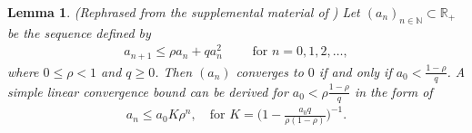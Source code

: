\documentclass{article}
\def\R{{\mathbb R}}
\newcommand{\hlnew}[1]{{#1}}
\newtheorem{lemma}{Lemma}
\begin{document}
\begin{lemma} 
\label{lem:scalar}
(Rephrased from the supplemental material of \cite{vu2018adaptive}) Let \hlnew{$(a_n)_{n \in \mathbb{N}} \subset \R_+$} be the sequence defined by 
\begin{align*}
a_{n+1} \leq \rho a_{n} + q a_{n}^2 \qquad \text{ for } n=0,1,2,\ldots ,
\end{align*}
where $0\le \rho<1$ and $q \ge 0$. Then $(a_n)$ converges to $0$ if and only if $a_0 < \frac{1-\rho}{q}$. 
A simple linear convergence bound can be derived for $a_0 < \rho \frac{1-\rho}{q}$ in the form of 
\begin{align*}
    a_n \le a_0 K \rho^n, \quad \text{for } K=\biggl(1 - \frac{a_0 q}{ \rho(1-\rho)}\biggr)^{-1} .
\end{align*}
\end{lemma}
\end{document}
